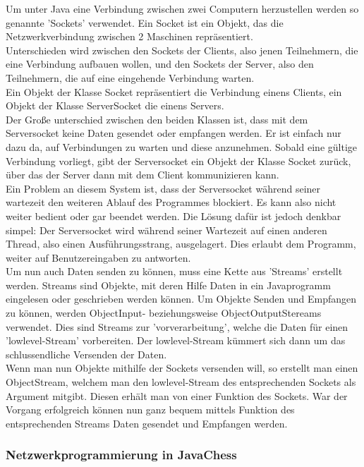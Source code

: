 \documentclass[12pt,a4paper]{article}
\begin{document}
{Um unter Java eine Verbindung zwischen zwei Computern herzustellen werden so genannte 'Sockets' verwendet. Ein Socket ist ein Objekt, das die Netzwerkverbindung zwischen 2 Maschinen repräsentiert.\\
Unterschieden wird zwischen den Sockets der Clients, also jenen Teilnehmern, die eine Verbindung aufbauen wollen, und den Sockets der Server, also den Teilnehmern, die auf eine eingehende Verbindung warten.\\
Ein Objekt der Klasse Socket repräsentiert die Verbindung einens Clients, ein Objekt der Klasse ServerSocket die einens Servers.\\
Der Große unterschied zwischen den beiden Klassen ist, dass mit dem Serversocket keine Daten gesendet oder empfangen werden. Er ist einfach nur dazu da, auf  Verbindungen zu warten und diese anzunehmen. Sobald eine gültige Verbindung vorliegt, gibt der Serversocket ein Objekt der Klasse Socket zurück, über das der Server dann mit dem Client kommunizieren kann.\\[2ex]
Ein Problem an diesem System ist, dass der Serversocket während seiner wartezeit den weiteren Ablauf des Programmes blockiert. Es kann also nicht weiter bedient oder gar beendet werden. Die Lösung dafür ist jedoch denkbar simpel: Der Serversocket wird während seiner Wartezeit auf einen anderen Thread, also einen Ausführungsstrang, ausgelagert. Dies erlaubt dem Programm, weiter auf Benutzereingaben zu antworten.\\[3ex]
Um nun auch Daten senden zu können, muss eine Kette aus 'Streams' erstellt werden. Streams sind Objekte, mit deren Hilfe Daten in ein Javaprogramm eingelesen oder geschrieben werden können. 
Um Objekte Senden und Empfangen zu können, werden ObjectInput- beziehungsweise ObjectOutputStereams verwendet. Dies sind Streams zur 'vorverarbeitung', welche die Daten für einen 'lowlevel-Stream' vorbereiten. Der lowlevel-Stream kümmert sich dann um das schlussendliche Versenden der Daten. \\[2ex]
Wenn man nun Objekte mithilfe der Sockets versenden will, so erstellt man einen ObjectStream, welchem man den lowlevel-Stream des entsprechenden Sockets als Argument mitgibt. Diesen erhält man von einer Funktion des Sockets. War der Vorgang erfolgreich können nun ganz bequem mittels Funktion des entsprechenden Streams Daten gesendet und Empfangen werden.

\subsubsection{Netzwerkprogrammierung in JavaChess}
\label{SUBSUBSEC:NETWORKJC}

}
\end{document}
